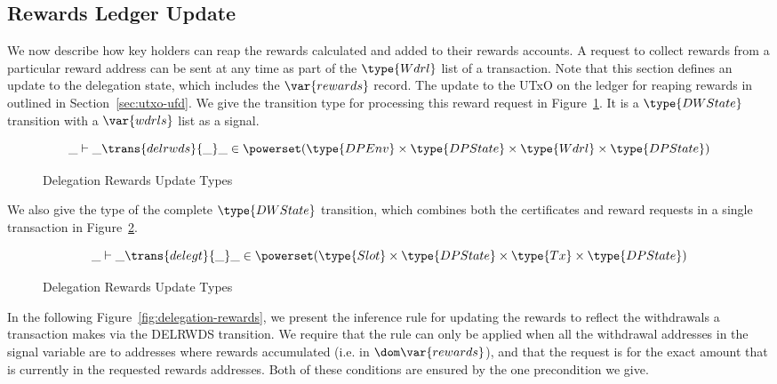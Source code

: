 \documentclass[11pt,a4paper,dvipsnames]{article}
\newcommand{\Tx}{\type{Tx}}
\newcommand{\Wdrl}{\type{Wdrl}}
\newcommand{\Slot}{\type{Slot}}
\newcommand{\DWState}{\type{DWState}}
\newcommand{\DPEnv}{\type{DPEnv}}
\newcommand{\DPState}{\type{DPState}}
\theoremstyle{definition}
\theoremstyle{definition}
\begin{document}
\clearpage

\subsection{Rewards Ledger Update}
\label{sec:utxo-rewards}

We now describe how key holders can reap the rewards calculated and added to
their rewards accounts. A request to collect rewards from a particular reward
address can be sent at any time as part of the $\Wdrl$ list of a transaction.
Note that this section defines an update to the delegation state, which includes
the $\var{rewards}$ record. The update to the UTxO on the ledger for reaping
rewards in outlined in Section~\ref{sec:utxo-ufd}.
We give the transition type for processing this reward request in
Figure~\ref{fig:delegation-rewards-type}. It is a $\DWState$ transition with a
$\var{wdrls}$ list as a signal.

\begin{figure}
\begin{equation*} \label{eq:rewards-upd}
  \_ \vdash \_ \trans{delrwds}{\_} \_ \in
    \powerset (\DPEnv \times \DPState \times \Wdrl \times \DPState)
\end{equation*}
\caption{Delegation Rewards Update Types}
\label{fig:delegation-rewards-type}
\end{figure}


We also give the type of the complete $\DWState$
transition, which combines both the certificates and reward
requests in a single transaction in Figure~\ref{fig:delegation-total-type}.

\begin{figure}
\begin{equation*} \label{eq:dstate-total}
  \_ \vdash \_ \trans{delegt}{\_} \_ \in
    \powerset (\Slot \times \DPState \times \Tx \times \DPState)
\end{equation*}

\caption{Delegation Rewards Update Types}
\label{fig:delegation-total-type}
\end{figure}


In the following Figure~\ref{fig:delegation-rewards}, we present the inference
rule for updating the rewards to reflect the withdrawals a transaction makes
via the DELRWDS transition. We require that the rule can only be applied when
all the withdrawal addresses in the signal variable
are to addresses where rewards accumulated (i.e. in $\dom \var{rewards}$), and
that the request is for the exact amount that is currently in the requested
rewards addresses. Both of these conditions are ensured by the one
precondition we give.
\end{document}
